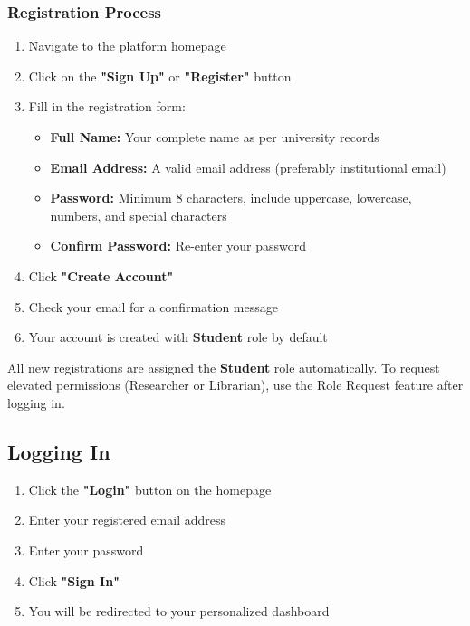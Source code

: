 \documentclass[12pt,a4paper]{article}
\begin{document}
\subsubsection{Registration Process}
\begin{enumerate}[leftmargin=*]
    \item Navigate to the platform homepage
    \item Click on the \textbf{"Sign Up"} or \textbf{"Register"} button
    \item Fill in the registration form:
        \begin{itemize}
            \item \textbf{Full Name:} Your complete name as per university records
            \item \textbf{Email Address:} A valid email address (preferably institutional email)
            \item \textbf{Password:} Minimum 8 characters, include uppercase, lowercase, numbers, and special characters
            \item \textbf{Confirm Password:} Re-enter your password
        \end{itemize}
    \item Click \textbf{"Create Account"}
    \item Check your email for a confirmation message
    \item Your account is created with \textbf{Student} role by default
\end{enumerate}

\begin{tcolorbox}[colback=yellow!10!white,colframe=orange,title=Important Note]
All new registrations are assigned the \textbf{Student} role automatically. To request elevated permissions (Researcher or Librarian), use the Role Request feature after logging in.
\end{tcolorbox}

\subsection{Logging In}
\begin{enumerate}[leftmargin=*]
    \item Click the \textbf{"Login"} button on the homepage
    \item Enter your registered email address
    \item Enter your password
    \item Click \textbf{"Sign In"}
    \item You will be redirected to your personalized dashboard
\end{enumerate}
\end{document}

